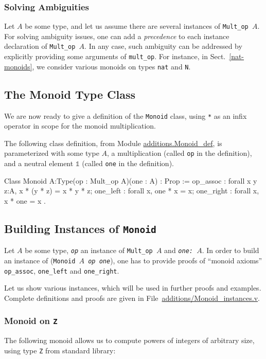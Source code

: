 \subsubsection{Solving Ambiguities}
Let $A$ be some type, and let us assume there are several instances of
\texttt{Mult\_op $A$}. For solving ambiguity issues, one can
add a \emph{precedence} to each instance declaration of  
\texttt{Mult\_op $A$}. In any case, such ambiguity  can be addressed
by explicitly providing  some arguments of \texttt{mult\_op}.
For instance, in Sect.~\vref{nat-monoids}, we consider various monoids on types
\texttt{nat} and \texttt{N}. 


\subsection{The Monoid Type Class}
We are now ready to  give a definition of the \texttt{Monoid} class, using
\texttt{*} as an infix operator in scope  for the monoid  multiplication.

The following class definition, from Module \href{../theories/html/hydras.additions.Monoid_def.html}{additions.Monoid\_def},
is parameterized with some type $A$,
a multiplication (called \texttt{op} in the definition), and a neutral element
$\mathds{1}$ (called \texttt{one} in the definition).


\begin{Coqsrc}
Class Monoid {A:Type}(op : Mult_op A)(one : A) : Prop :=
{
    op_assoc : forall x y z:A, x * (y * z) = x * y * z;
    one_left : forall x, one * x = x;
    one_right : forall x, x * one = x
}.
\end{Coqsrc}


\subsection{Building Instances of \texttt{Monoid}}
Let \texttt{$A$} be some type, \texttt{{\it op}} an instance of 
\texttt{Mult\_op $A$} and \texttt{\it one: $A$}.
In order to build an instance of (\texttt{Monoid $A$ {\it op} {\it one}}),
one has to provide proofs of ``monoid axioms'' \texttt{ op\_assoc},
\texttt{one\_left} and \texttt{one\_right}.

Let us show various instances, which will be used in further proofs and examples.
Complete definitions and proofs are given in 
File~\href{../theories/html/hydras.additions.Monoid_instances.html}{additions/Monoid\_instances.v}.


\subsubsection{Monoid on \texttt{Z}}
The following monoid allows us to compute powers of integers of arbitrary size, 
using type \texttt{Z} from standard library:

